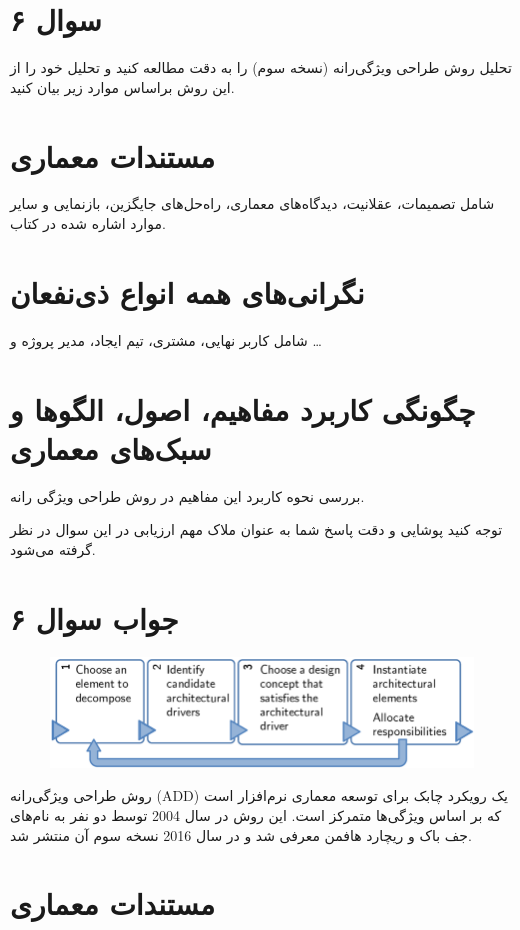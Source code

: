 \section*{سوال ۶}

تحلیل روش طراحی ویژگی‌رانه (نسخه سوم) را به دقت مطالعه کنید و تحلیل خود را از این روش براساس موارد زیر بیان کنید.

\section*{مستندات معماری}
شامل تصمیمات، عقلانیت، دیدگاه‌های معماری، راه‌حل‌های جایگزین، بازنمایی و سایر موارد اشاره شده در کتاب.

\section*{نگرانی‌های همه انواع ذی‌نفعان}
شامل کاربر نهایی، مشتری، تیم ایجاد، مدیر پروژه و …

\section*{چگونگی کاربرد مفاهیم، اصول، الگوها و سبک‌های معماری}
بررسی نحوه کاربرد این مفاهیم در روش طراحی ویژگی رانه.

توجه کنید پوشایی و دقت پاسخ شما به عنوان ملاک مهم ارزیابی در این سوال در نظر گرفته می‌شود.

\section*{جواب سوال ۶}

\begin{figure}[H]
	\centering
	\includegraphics{pic10.png}
	\label{fig:label4}
\end{figure}

روش طراحی ویژگی‌رانه (ADD) یک رویکرد چابک برای توسعه معماری نرم‌افزار است که بر اساس ویژگی‌ها متمرکز است. این روش در سال 2004 توسط دو نفر به نام‌های جف باک و ریچارد هافمن معرفی شد و در سال 2016 نسخه سوم آن منتشر شد.

\section{مستندات معماری}

